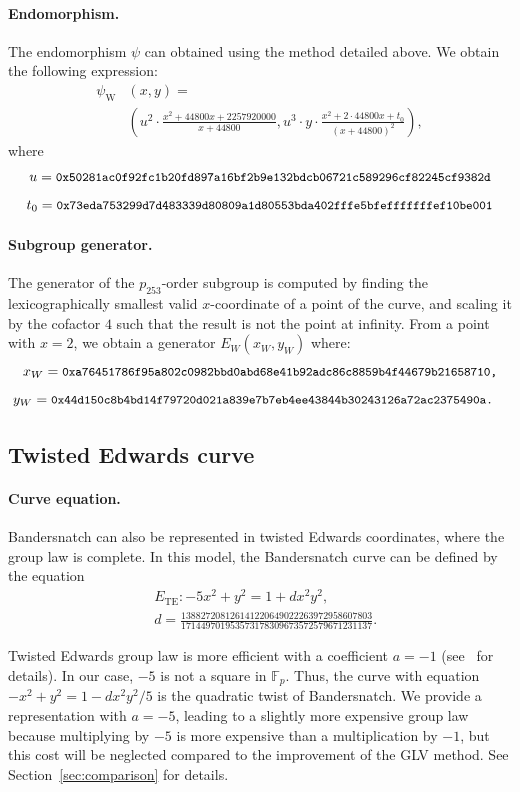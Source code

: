 \documentclass[version=preprint]{iacrcc}
\newcommand{\Fp}{\ensuremath{\mathbb F_p}}
\begin{document}
\paragraph{Endomorphism.}
The endomorphism $\psi$ can obtained using the method detailed above.
We obtain the following expression:
\begin{align*}
  \psi_\text{W}&(x,y) = \\
  &\left(u^2\cdot \frac{x^2+44800x+2257920000}{x+44800}, u^3\cdot
y\cdot \frac{x^2+2\cdot 44800x+t_0}{(x+44800)^2}\right),
\end{align*}
where
$$u = \text{{\small{\tt 0x50281ac0f92fc1b20fd897a16bf2b9e132bdcb06721c589296cf82245cf9382d}}}$$
$$t_0 = \text{{\small{\tt 0x73eda753299d7d483339d80809a1d80553bda402fffe5bfefffffffef10be001}}}$$

\paragraph{Subgroup generator.}
The generator of the $p_{253}$-order subgroup is computed by finding the
lexicographically smallest valid $x$-coordinate of a point of the
curve, and scaling it by the cofactor $4$ such that the result is not
the point at infinity. From a point with $x=2$, we obtain a generator $E_W(x_W,y_W)$ where:
$$x_W = \text{{\small{\tt 0xa76451786f95a802c0982bbd0abd68e41b92adc86c8859b4f44679b21658710,}}}$$
$$y_W = \text{{\small{\tt 0x44d150c8b4bd14f79720d021a839e7b7eb4ee43844b30243126a72ac2375490a.
}}}$$


\subsection{Twisted Edwards curve}
\paragraph{Curve equation.}
Bandersnatch can also be represented in twisted Edwards coordinates,
where the group law is complete.
In this model, the Bandersnatch curve can be defined by the equation
\begin{align*}
&E_\text{TE}:-5x^2+y^2 = 1 + dx^2y^2, \\
&d=\frac{138827208126141220649022263972958607803}{171449701953573178309673572579671231137}.
\end{align*}

Twisted Edwards group law is more efficient with a coefficient
$a = -1$ (see~\cite{AC:HWCD08} for details).
In our case, $-5$ is not a square in $\Fp$. Thus, the curve with
equation $-x^2+y^2 = 1 -dx^2y^2/5$ is the quadratic twist of
Bandersnatch. We provide a representation with $a=-5$, leading to a
slightly more expensive group law because multiplying by $-5$ is more
expensive than a multiplication by $-1$, but this cost will be
neglected compared to the improvement of the GLV method. See
Section~\ref{sec:comparison} for details.
\end{document}
